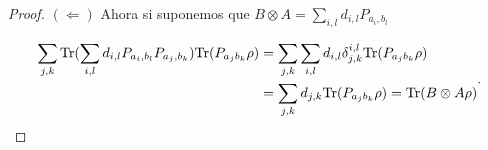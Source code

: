 \documentclass[12pt,oneside]{book}\raggedbottom{}
\begin{document}
\begin{proof}
\begin{comment}
	De ello  \[B\otimes A=\sum_{j,k} \tr((B\otimes A)P_{a_j, b_k})P_{a_j, b_k}=\sum_{j,k}d_{j,k}P_{a_j,b_k},\] notemos que
\[\begin{split}[A\otimes B, B\otimes A ]&= A\otimes B (B\otimes A)-B\otimes A (A\otimes B)\\
&=(\sum_{j,k}a_j b_k P_{a_j, b_k})(\sum_{i,l} \tr((B\otimes A)P_{a_i, b_l})P_{a_i, b_l})\\
&- (\sum_{i,l} \tr((B\otimes A)P_{a_i, b_l})P_{a_j, b_k})(\sum_{j,k}a_j b_k P_{a_j, b_k})\\
&=\sum_{j,k,i,l}a_j b_k  \tr((B\otimes A)P_{a_i, b_l})P_{a_j, b_k}P_{a_i, b_l}\\
&- (\sum_{i,l,j,k} a_j b_k \tr((B\otimes A)P_{a_i, b_l})P_{a_i, b_l} P_{a_j, b_k})\\
&=\sum_{j,k}a_j b_k  \tr((B\otimes A)P_{a_j, b_k})-\sum_{i,l} a_i b_l \tr((B\otimes A)P_{a_i, b_l})=\mathbf{0}\\
\end{split}\]
\end{comment}






\begin{comment}
	Ejemplo: Sea $Q=c_{0+}|0+\rala 0+|+c_{0-}|0-\rala 0-|+ c_{1+}|1+\rala 1+|+c_{1-}|1-\rala 1-|$ y 


$SQS=c_{0+}|+0\rala +0|+c_{0-}|-0\rala -0|+ c_{1+}|+1\rala +1|+c_{1-}|-1\rala -1|$ pero también supongamos que \[SQS=\sum_{j,k}\tr(SQS P_{d_{jk}})P_{d_{j,k}}\]

donde $\tr(SQS|0+\rala0+|)=\frac{1}{4}(c_{0+}+c_{0-}+c_{1+}+c_{1-})$




\end{comment}















$(\Leftarrow)$
Ahora si suponemos que $B\otimes A=\sum_{i,l}d_{i,l}P_{a_i, b_l}$

\[\begin{split}\sum_{j,k}{\rm Tr}( \sum_{i,l}d_{i,l}P_{a_i, b_l} P_{a_j,b_k}){\rm Tr}(P_{a_j b_k}\rho )&=\sum_{j,k}\sum_{i,l}d_{i,l}\delta_{j,k}^{i,l}{\rm Tr}(P_{a_j b_k}\rho )\\&=\sum_{j,k}d_{j,k}{\rm Tr}(P_{a_j b_k}\rho )={\rm Tr}(B\otimes A\rho)\end{split}.\]


\end{proof}
\end{document}
